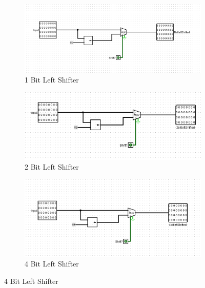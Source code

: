 \documentclass{article}
\begin{document}
\begin{figure}[H]
    \centering
    \begin{subfigure}[b]{0.3\textwidth}
        \includegraphics[width=\textwidth]{1bitleftshifter.png} %
        \caption{1 Bit Left Shifter}
        \label{fig:1bit}
    \end{subfigure}
    \hfill
    \begin{subfigure}[b]{0.3\textwidth}
        \includegraphics[width=\textwidth]{2bitleftshifter.png} %
        \caption{2 Bit Left Shifter}
        \label{fig:2bit}
    \end{subfigure}
    \hfill
    \begin{subfigure}[b]{0.3\textwidth}
        \includegraphics[width=\textwidth]{4bitleftshifter.png} %
        \caption{4 Bit Left Shifter}
        \label{fig:4bit}
    \end{subfigure}


\end{figure}
\end{document}
